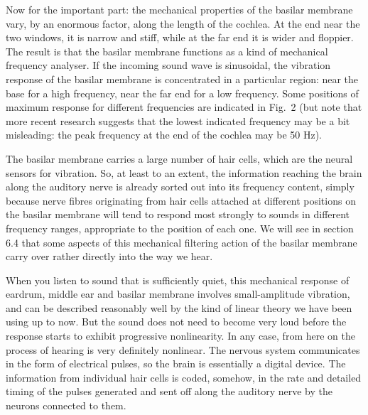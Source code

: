 
  Now for the important part: the mechanical properties of the basilar membrane 
  vary, by an enormous factor, along the length of the cochlea. At the end near 
  the two windows, it is narrow and stiff, while at the far end it is wider and 
  floppier. The result is that the basilar membrane functions as a kind of 
  mechanical frequency analyser. If the incoming sound wave is sinusoidal, the 
  vibration response of the basilar membrane is concentrated in a particular 
  region: near the base for a high frequency, near the far end for a low 
  frequency. Some positions of maximum response for different frequencies are 
  indicated in Fig.\ 2 (but note that more recent research suggests that the 
  lowest indicated frequency may be a bit misleading: the peak frequency at the 
  end of the cochlea may be 50 Hz). 

  The basilar membrane carries a large number of hair cells, which are the 
  neural sensors for vibration. So, at least to an extent, the information 
  reaching the brain along the auditory nerve is already sorted out into its 
  frequency content, simply because nerve fibres originating from hair cells 
  attached at different positions on the basilar membrane will tend to respond 
  most strongly to sounds in different frequency ranges, appropriate to the 
  position of each one. We will see in section 6.4 that some aspects of this 
  mechanical filtering action of the basilar membrane carry over rather 
  directly into the way we hear. 

  When you listen to sound that is sufficiently quiet, this mechanical response 
  of eardrum, middle ear and basilar membrane involves small-amplitude 
  vibration, and can be described reasonably well by the kind of linear theory 
  we have been using up to now. But the sound does not need to become very loud 
  before the response starts to exhibit progressive nonlinearity. In any case, 
  from here on the process of hearing is very definitely nonlinear. The nervous 
  system communicates in the form of electrical pulses, so the brain is 
  essentially a digital device. The information from individual hair cells is 
  coded, somehow, in the rate and detailed timing of the pulses generated and 
  sent off along the auditory nerve by the neurons connected to them. 


